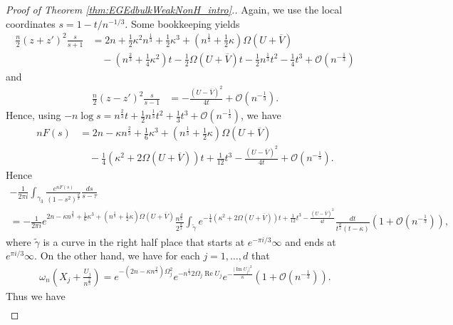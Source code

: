 \documentclass[%
 jmp,
cp,  %
 amsmath,amsthm,amssymb,%
 reprint,%
onecolumn]{revtex4-2}
\begin{document}
\begin{proof}[Proof of Theorem \ref{thm:EGEdbulkWeakNonH_intro}.]
Again, we use the local coordinates $s=1-t/n^{-1/3}$. Some bookkeeping  yields
\begin{align*}
\frac{n}{2} (z+z')^2 \frac{s}{s+1} &= 2n + \frac{1}{2}\kappa^2 n^\frac{1}{3} + \frac{1}{2}\kappa^3 + (n^\frac{1}{3} + \frac{1}{2}\kappa) \Omega (U+\overline V)\\
&\quad - (n^\frac{2}{3} + \frac{1}{4} \kappa^2) t - \frac{1}{2} \Omega (U+\overline V) t
 - \frac{1}{2} n^\frac{1}{3} t^2 - \frac{1}{4} t^3
 + \mathcal O(n^{-\frac{1}{3}})
\end{align*}
and
\begin{align*}
\frac{n}{2} (z-z')^2 \frac{s}{s-1} &= -\frac{(U-\overline V)^2}{4 t} + \mathcal O(n^{-\frac{1}{3}}).
\end{align*}
Hence, using $-n \log s = n^{\frac{2}{3}} t + \frac{1}{2} n^{\frac{1}{3}} t^2 + \frac{1}{3} t^3 +  \mathcal O(n^{-\frac{1}{3}})$, we have
\begin{align*}
nF(s) &=  2n - \kappa n^\frac{2}{3} + \frac{1}{6}\kappa^3 + (n^\frac{1}{3} + \frac{1}{2}\kappa) \Omega (U+\overline V)\\
&\quad - \frac{1}{4} (\kappa^2 + 2 \Omega (U+\overline V)) t + \frac{1}{12} t^3 -\frac{(U-\overline V)^2}{4 t} + \mathcal O(n^{-\frac{1}{3}}).
\end{align*}
Hence
\begin{multline} \label{eq:EGEdBulkWeakNonH2a}
-\frac{1}{2\pi i} \int_{\gamma_3} \frac{e^{n F(s)}}{(1-s^2)^\frac{d}{2}} \frac{ds}{s-\tau}\\
= -\frac{1}{2\pi i} e^{2n - \kappa n^\frac{2}{3} + \frac{1}{6}\kappa^3 + (n^\frac{1}{3} + \frac{1}{2}\kappa) \Omega (U+\overline V)} \frac{n^\frac{d}{6}}{2^\frac{d}{2}} \int_{\tilde\gamma} e^{- \frac{1}{4} (\kappa^2 + 2 \Omega (U+\overline V)) t + \frac{1}{12} t^3 -\frac{(U-\overline V)^2}{4 t}} \frac{dt}{t^\frac{d}{2} (t-\kappa)} \left(1+\mathcal O\left(n^{-\frac{1}{3}}\right)\right),
\end{multline}
where $\tilde\gamma$ is a curve in the right half place that starts at $e^{-\pi i/3} \infty$ and ends at $e^{\pi i/3} \infty$.
On the other hand, we have for each $j=1,\ldots, d$ that
\begin{align*}
\omega_n\left(X_j+\frac{U_j}{n^\frac{2}{3}}\right)
= e^{-(2n - \kappa n^\frac{2}{3}) \Omega_j^2} 
e^{-n^\frac{1}{3} 2\Omega_j \operatorname{Re}U_j
}
e^{- \frac{\lvert \operatorname{Im} U_j\rvert^2}{\kappa}}
\left(1 + \mathcal O\left(n^{-\frac{1}{3}}\right)\right).
\end{align*}
Thus we have
\begin{multline} \label{eq:weakNonHd}

\end{multline}
\end{proof}
\end{document}
